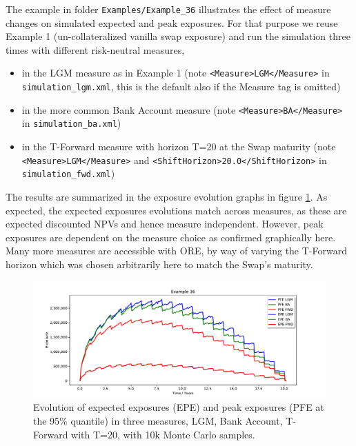 \documentclass[12pt, a4paper]{article}
\begin{document}
{The example in folder {\tt Examples/Example\_36} illustrates the effect of measure changes on simulated expected and peak exposures. For that purpose we reuse Example 1 (un-collateralized vanilla swap exposure) and run the simulation three times with different risk-neutral measures,
\begin{itemize}
\item in the LGM measure as in Example 1 (note {\tt <Measure>LGM</Measure>} in {\tt simulation\_lgm.xml}, this is the default also if the Measure tag is omitted)  
\item in the more common Bank Account measure (note {\tt <Measure>BA</Measure>} in {\tt simulation\_ba.xml})  
\item in the T-Forward measure with horizon T=20 at the Swap maturity (note {\tt <Measure>LGM</Measure>}  and {\tt <ShiftHorizon>20.0</ShiftHorizon>} in {\tt simulation\_fwd.xml})
\end{itemize}

The results are summarized in the exposure evolution graphs in figure \ref{fig:36}. As expected, the expected exposures evolutions match across measures, as these are expected discounted NPVs and hence measure independent.
However, peak exposures are dependent on the measure choice as confirmed graphically here. Many more measures are accessible with ORE, by way of varying the T-Forward horizon which was chosen arbitrarily here to match the Swap's maturity.

\begin{figure}[h!]
\begin{center}
\includegraphics[scale=0.45]{mpl_exposures_measures.pdf}
\end{center}
\caption{Evolution of expected exposures (EPE) and peak exposures (PFE at the 95\% quantile) in three measures, LGM, Bank Account, T-Forward with T=20, with 10k Monte Carlo samples.}
\label{fig:36}
\end{figure}

\clearpage
}
\end{document}

